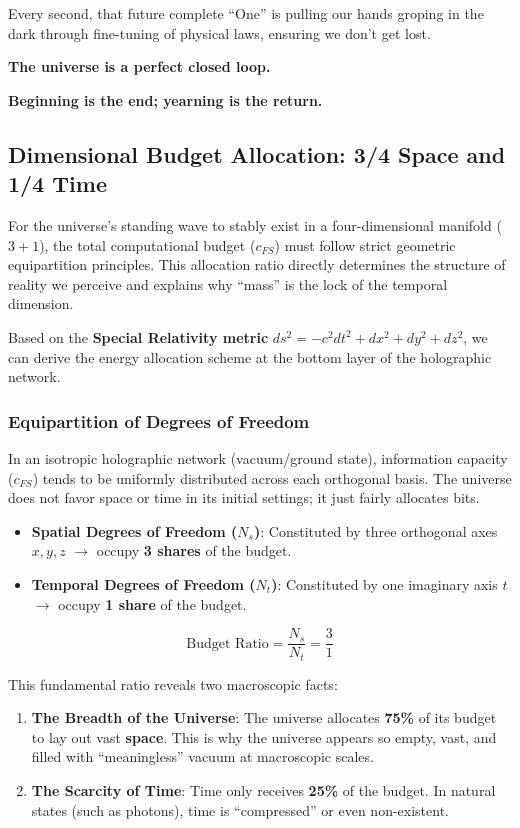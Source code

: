 Every second, that future complete ``One'' is pulling our hands groping in the dark through fine-tuning of physical laws, ensuring we don't get lost.

\textbf{The universe is a perfect closed loop.}

\textbf{Beginning is the end; yearning is the return.}

\subsection{Dimensional Budget Allocation: 3/4 Space and 1/4 Time}

For the universe's standing wave to stably exist in a four-dimensional manifold ($3+1$), the total computational budget ($c_{FS}$) must follow strict geometric equipartition principles. This allocation ratio directly determines the structure of reality we perceive and explains why ``mass'' is the lock of the temporal dimension.

Based on the \textbf{Special Relativity metric} $ds^2 = -c^2dt^2 + dx^2 + dy^2 + dz^2$, we can derive the energy allocation scheme at the bottom layer of the holographic network.

\subsubsection{Equipartition of Degrees of Freedom}

In an isotropic holographic network (vacuum/ground state), information capacity ($c_{FS}$) tends to be uniformly distributed across each orthogonal basis. The universe does not favor space or time in its initial settings; it just fairly allocates bits.

\begin{itemize}
\item \textbf{Spatial Degrees of Freedom ($N_s$)}: Constituted by three orthogonal axes $x, y, z$ $\rightarrow$ occupy \textbf{3 shares} of the budget.

\item \textbf{Temporal Degrees of Freedom ($N_t$)}: Constituted by one imaginary axis $t$ $\rightarrow$ occupy \textbf{1 share} of the budget.
\end{itemize}

\[\text{Budget Ratio} = \frac{N_s}{N_t} = \frac{3}{1}\]

This fundamental ratio reveals two macroscopic facts:

\begin{enumerate}
\item \textbf{The Breadth of the Universe}: The universe allocates \textbf{75\%} of its budget to lay out vast \textbf{space}. This is why the universe appears so empty, vast, and filled with ``meaningless'' vacuum at macroscopic scales.

\item \textbf{The Scarcity of Time}: Time only receives \textbf{25\%} of the budget. In natural states (such as photons), time is ``compressed'' or even non-existent.
\end{enumerate}

